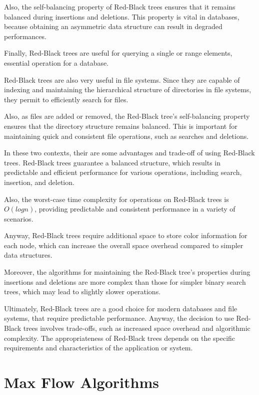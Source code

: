 \documentclass[12pt]{amsart}
\begin{document}
    Also, the self-balancing property of Red-Black trees ensures
    that it remains balanced during insertions and deletions.
    This property is vital in databases, because obtaining an
    asymmetric data structure can result in degraded
    performances.
    
    Finally, Red-Black trees are useful for querying a single or
    range elements, essential operation for a database.
    
    
    Red-Black trees are also very useful in file systems.
    Since they are capable of indexing and maintaining the
    hierarchical structure of directories in file systems, they
    permit to efficiently search for files.
    
    Also, as files are added or removed, the Red-Black tree's
    self-balancing property ensures that the directory structure
    remains balanced. This is important for maintaining quick
    and consistent file operations, such as searches and
    deletions.
    
    
    In these two contexts, their are some advantages and
    trade-off of using Red-Black trees. Red-Black trees
    guarantee a balanced structure, which results in predictable
    and efficient performance for various operations, including
    search, insertion, and deletion.
    
    Also, the worst-case time complexity for operations on
    Red-Black trees is $O(log n)$, providing predictable and
    consistent performance in a variety of scenarios.
    
    Anyway, Red-Black trees require additional space to store
    color information for each node, which can increase the
    overall space overhead compared to simpler data structures.
    
    Moreover, the algorithms for maintaining the Red-Black
    tree's properties during insertions and deletions are more
    complex than those for simpler binary search trees, which
    may lead to slightly slower operations.
    
    Ultimately, Red-Black trees are a good choice for modern
    databases and file systems, that require predictable
    performance. Anyway, the decision to use Red-Black trees
    involves trade-offs, such as increased space overhead and
    algorithmic complexity. The appropriateness of Red-Black
    trees depends on the specific requirements and
    characteristics of the application or system.
    
\section{Max Flow Algorithms}
\end{document}

